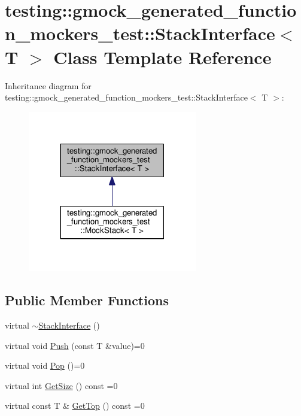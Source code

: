 \hypertarget{classtesting_1_1gmock__generated__function__mockers__test_1_1StackInterface}{}\section{testing\+:\+:gmock\+\_\+generated\+\_\+function\+\_\+mockers\+\_\+test\+:\+:Stack\+Interface$<$ T $>$ Class Template Reference}
\label{classtesting_1_1gmock__generated__function__mockers__test_1_1StackInterface}


Inheritance diagram for testing\+:\+:gmock\+\_\+generated\+\_\+function\+\_\+mockers\+\_\+test\+:\+:Stack\+Interface$<$ T $>$\+:\nopagebreak
\begin{figure}[H]
\begin{center}
\leavevmode
\includegraphics[width=209pt]{classtesting_1_1gmock__generated__function__mockers__test_1_1StackInterface__inherit__graph}
\end{center}
\end{figure}
\subsection*{Public Member Functions}
\begin{DoxyCompactItemize}
\item 
virtual \hyperlink{classtesting_1_1gmock__generated__function__mockers__test_1_1StackInterface_a87b83db3e9cb1c986d6b0649b37cfa7c}{$\sim$\+Stack\+Interface} ()
\item 
virtual void \hyperlink{classtesting_1_1gmock__generated__function__mockers__test_1_1StackInterface_a49448f6195021fee947d37b80b6e5d30}{Push} (const T \&value)=0
\item 
virtual void \hyperlink{classtesting_1_1gmock__generated__function__mockers__test_1_1StackInterface_a1a6646d1d9febe90c607b9b3e4539b67}{Pop} ()=0
\item 
virtual int \hyperlink{classtesting_1_1gmock__generated__function__mockers__test_1_1StackInterface_a537ec8647a2333f50e5f923a85b90eba}{Get\+Size} () const =0
\item 
virtual const T \& \hyperlink{classtesting_1_1gmock__generated__function__mockers__test_1_1StackInterface_af36e32b9ae568100363466d1ebf95364}{Get\+Top} () const =0
\end{DoxyCompactItemize}


